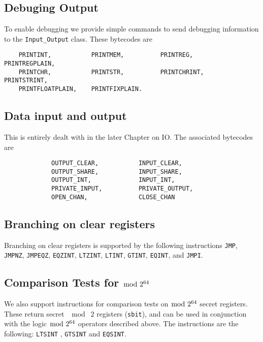 \subsection{Debuging Output}
To enable debugging we provide simple commands to send
debugging information to the \verb+Input_Output+ class.
These bytecodes are
\begin{verbatim}
    PRINTINT,           PRINTMEM,          PRINTREG,           PRINTREGPLAIN,
    PRINTCHR,           PRINTSTR,          PRINTCHRINT,        PRINTSTRINT,
    PRINTFLOATPLAIN,    PRINTFIXPLAIN.
\end{verbatim}

\subsection{Data input and output}
This is entirely dealt with in the later Chapter on IO.
The associated bytecodes are
\begin{verbatim}
             OUTPUT_CLEAR,           INPUT_CLEAR, 
             OUTPUT_SHARE,           INPUT_SHARE, 
             OUTPUT_INT,             INPUT_INT,
             PRIVATE_INPUT,          PRIVATE_OUTPUT,
             OPEN_CHAN,              CLOSE_CHAN
\end{verbatim}

\subsection{Branching on clear registers}
Branching on clear registers is supported by the following
instructions
 \verb+JMP+,
    \verb+JMPNZ+,
    \verb+JMPEQZ+,
    \verb+EQZINT+,
    \verb+LTZINT+,
    \verb+LTINT+,
    \verb+GTINT+,
    \verb+EQINT+,
and
    \verb+JMPI+.

\subsection{Comparison Tests for $\bmod \; 2^{64}$}
We also support instructions for comparison tests on $\bmod \; 2^{64}$ secret registers. These return 
secret $\mod \; 2$ registers (\verb+sbit+), and can be used in conjunction with the logic $\bmod \; 2^{64}$ operators described above. The instructions are the following: 
\verb+LTSINT+ ,
\verb+GTSINT+ and
\verb+EQSINT+.


